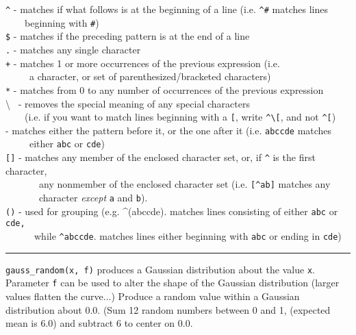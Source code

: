 \texttt{\^{}} - matches if what follows is at the beginning of
a line (i.e. \texttt{\^{}\#} matches lines \ \\
 \ \ \ \ beginning with
\texttt{{\textquotedbl}\#{\textquotedbl}})\\
\texttt{\$} - matches if the preceding pattern is at the end of a
line\\
\texttt{.} - matches any single character\\
\texttt{+} - matches 1 or more occurrences of the previous
expression (i.e. \\
 \ \ \ \ \ a character, or set of parenthesized/bracketed
characters)\\
\texttt{*} - matches from 0 to any number of occurrences of the previous
expression\\
{\textbackslash} \ {}- removes the special meaning of any special
characters\\
 \ \ \ \ (i.e. if you want to match lines beginning with a
\texttt{{\textquotedbl}[{\textquotedbl}}, write
\texttt{\^{}{\textbackslash}[}, and not \texttt{\^{}[})\\
\texttt{{\textbar}} - matches either the pattern before it, or the one
after it (i.e. \texttt{abc{\textbar}cde} matches\\
 \ \ \ \ \  either \texttt{abc} or \texttt{cde})\\
\texttt{[]} - matches any member of the enclosed character set, or, if
\texttt{\^{}} is the first character,\\
 \ \ \ \ \ \ \ any nonmember of the enclosed character set (i.e.
\texttt{[\^{}ab]} matches any
\\
 \ \ \ \ \ \ \ character \textit{except} \texttt{a} and \texttt{b}).\\
\texttt{()} - used for grouping (e.g. \^{}(abc{\textbar}cde). matches
lines consisting of either \texttt{{\textquotedbl}abc{\textquotedbl}}
or \texttt{{\textquotedbl}cde{\textquotedbl},}\\
 \ \ \ \ \ \ while \texttt{\^{}abc{\textbar}cde}. matches lines either
beginning with \texttt{{\textquotedbl}abc{\textquotedbl}} or ending in
\texttt{{\textquotedbl}cde{\textquotedbl}})

\vspace{0.25cm}\hrule{}

\texttt{gauss\_random(x, f)} produces a Gaussian distribution about the value \texttt{x}.
Parameter \texttt{f} can be used to alter the shape of the Gaussian
distribution (larger values flatten the curve...) Produce a random
value within a Gaussian distribution about 0.0. (Sum 12 random numbers
between 0 and 1, (expected mean is 6.0) and subtract 6 to center on 0.0.

